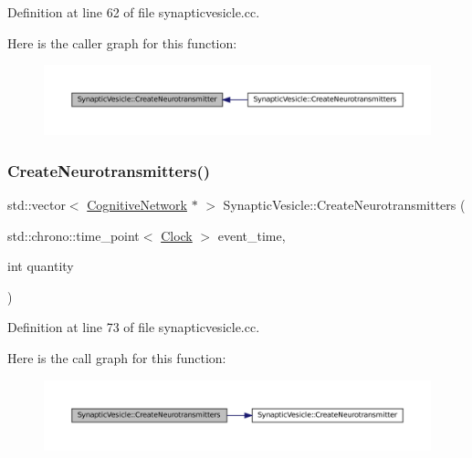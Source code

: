 Definition at line 62 of file synapticvesicle.\+cc.

Here is the caller graph for this function\+:\nopagebreak
\begin{figure}[H]
\begin{center}
\leavevmode
\includegraphics[width=350pt]{class_synaptic_vesicle_a89f4fd3ed27a7dc768de215534325d6a_icgraph}
\end{center}
\end{figure}
\mbox{\label{class_synaptic_vesicle_a052b85a42c2d55ca146665c40cbabffd}} 
\subsubsection{\texorpdfstring{Create\+Neurotransmitters()}{CreateNeurotransmitters()}}
{\footnotesize\ttfamily std\+::vector$<$ \mbox{\hyperlink{class_cognitive_network}{Cognitive\+Network}} $\ast$ $>$ Synaptic\+Vesicle\+::\+Create\+Neurotransmitters (\begin{DoxyParamCaption}\item[{std\+::chrono\+::time\+\_\+point$<$ \mbox{\hyperlink{universe_8h_a0ef8d951d1ca5ab3cfaf7ab4c7a6fd80}{Clock}} $>$}]{event\+\_\+time,  }\item[{int}]{quantity }\end{DoxyParamCaption})}



Definition at line 73 of file synapticvesicle.\+cc.

Here is the call graph for this function\+:\nopagebreak
\begin{figure}[H]
\begin{center}
\leavevmode
\includegraphics[width=350pt]{class_synaptic_vesicle_a052b85a42c2d55ca146665c40cbabffd_cgraph}
\end{center}
\end{figure}
\mbox{\label{class_synaptic_vesicle_a5ab4ecfb4a880bc729078f5529c547bc}} 
